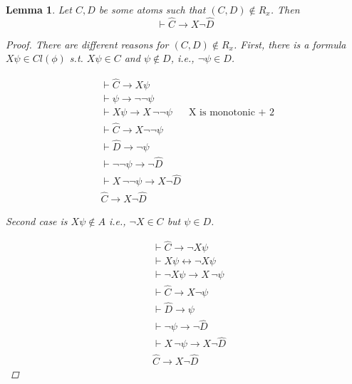 \documentclass[11pt]{article}
\newtheorem{lemma}[theorem]{Lemma}
\theoremstyle{definition}
\theoremstyle{remark}
\begin{document}
\begin{lemma}
    Let $C,D$ be some atoms such that $(C, D) \notin R_x$. Then
    \[
        \vdash \hat{C} \rightarrow X \neg \hat{D}
    \]

    \begin{proof}
        There are different reasons for $(C, D) \notin R_x$. First, there is a formula $X \psi \in Cl(\phi)$ s.t.
        $X \psi \in C$ and $\psi \notin D$, i.e., $\neg \psi \in D$.

        \[
            \begin{array}{rll} 
                    &  \vdash \hat{C} \rightarrow X \psi \\
                    &  \vdash  \psi \rightarrow \neg \neg \psi \\
                    &  \vdash X \psi \rightarrow X \, \neg \neg \psi 
                    &  \text{X is monotonic + 2 } \\
                    &  \vdash \hat{C} \rightarrow X \neg \neg \psi \\
                    &  \vdash \hat{D} \rightarrow \neg \psi \\
                    &  \vdash \neg \neg \psi \rightarrow \neg \hat{D} \\
                    &  \vdash X \, \neg \neg \psi \rightarrow X \neg \hat{D} \\
                    &  \hat{C} \rightarrow X \neg \hat{D}



            \end{array}
        \]

        Second case is $X \psi \notin A$ i.e., $\neg X \in C$ but $\psi \in D$.

                \[
            \begin{array}{rll} 
                    &  \vdash \hat{C} \rightarrow \neg X \psi \\
                    &  \vdash  X \psi \leftrightarrow \neg X \psi \\
                    &  \vdash \neg X \psi \rightarrow X \, \neg \psi \\
                    &  \vdash \hat{C} \rightarrow X \neg \psi \\
                    &  \vdash \hat{D} \rightarrow \psi \\
                    &  \vdash \neg \psi \rightarrow \neg \hat{D } \\
                    &  \vdash X \,\neg \psi \rightarrow X \neg \hat{D} \\
                    &  \hat{C} \rightarrow X \neg \hat{D}



\end{array}\]
\end{proof}
\end{lemma}
\end{document}
